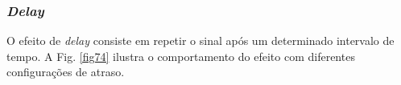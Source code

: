 





\subsubsection*{\textit{Delay}}

O efeito de \textit{delay} consiste em repetir o sinal após um determinado intervalo de tempo. A Fig. \ref{fig74} ilustra o comportamento do efeito com diferentes configurações de atraso.

